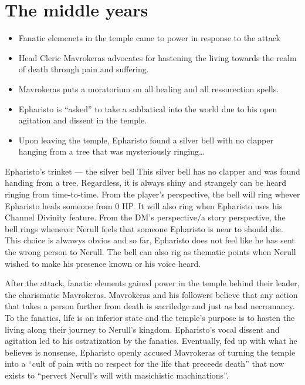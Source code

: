 \documentclass[10pt,twoside,twocolumn,openany]{book}
\begin{document}
\section{The middle years}
\begin{itemize}
  \item Fanatic elemenets in the temple came to power in response to the attack
  \item Head Cleric Mavrokeras advocates for hastening the living towards the realm of death through pain and suffering.
  \item Mavrokeras puts a moratorium on all healing and all ressurection spells.
  \item Epharisto is ``asked'' to take a sabbatical into the world due to his open agitation and dissent in the temple.
  \item Upon leaving the temple, Epharisto found a silver bell with no clapper hanging from a tree that was mysteriously ringing\ldots
\end{itemize}
\begin{commentbox}{Epharisto's trinket --- the silver bell}
  This silver bell has no clapper and was found handing from a tree.
  Regardless, it is always shiny and strangely can be heard ringing from time-to-time. From the player's perspective, the bell will ring whever Epharisto heals someone from 0 HP.\@
  It will also ring when Epharisto uses his Channel Divinity feature.
  From the DM's perspective/a story perspective, the bell rings whenever Nerull feels that someone Epharisto is near to should die.
  This choice is alwawys obvios and so far, Epharisto does not feel like he has sent the wrong person to Nerull.
  The bell can also rig as thematic points when Nerull wished to make his presence known or his voice heard.
\end{commentbox}
After the attack, fanatic elements gained power in the temple behind their leader, the charismatic Mavrokeras.
Mavrokeras and his followers believe that any action that takes a person further from death is sacriledge and just as bad necromancy.
To the fanatics, life is an inferior state and the temple's purpose is to hasten the living along their journey to Nerull's kingdom.
Epharisto's vocal dissent and agitation led to his ostratization by the fanatics.
Eventually, fed up with what he believes is nonsense, Epharisto openly accused Mavrokeras of turning the temple into a ``cult of pain with no respect for the life that preceeds death'' that now exists to ``pervert Nerull's will with masichistic machinations''. \\
\end{document}
